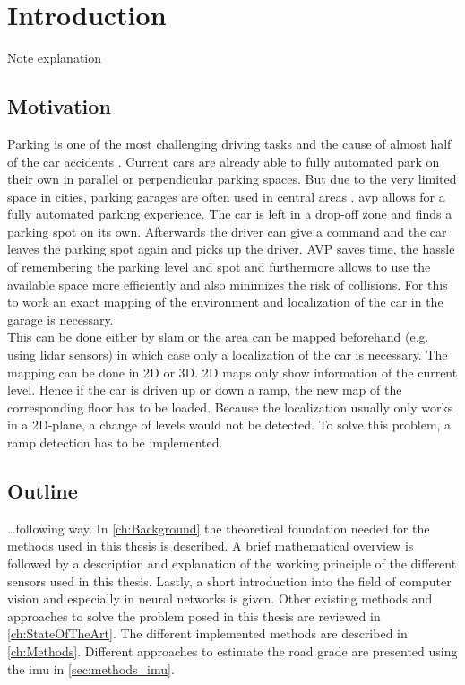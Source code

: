 \chapter{Introduction}
\label{ch:Introduction}
Note explanation

\section{Motivation}
Parking is one of the most challenging driving tasks and the cause of almost half of the car accidents \cite{accident}.
Current cars are already able to fully automated park on their own in parallel or perpendicular parking spaces.
But due to the very limited space in cities, parking garages are often used in central areas \cite{Banzhaf2017}.
\gls{avp} allows for a fully automated parking experience.
The car is left in a drop-off zone and finds a parking spot on its own.
Afterwards the driver can give a command and the car leaves the parking spot again and picks up the driver.
AVP saves time, the hassle of remembering the parking level and spot and furthermore allows to use the available space more efficiently and also minimizes the risk of collisions.
For this to work an exact mapping of the environment and localization of the car in the garage is necessary.\\
This can be done either by \gls{slam} or the area can be mapped beforehand (e.g. using \gls{lidar} sensors) in which case only a localization of the car is necessary.
The mapping can be done in 2D or 3D. 2D maps only show information of the current level. Hence if the car is driven up or down a ramp, the new map of the corresponding floor has to be loaded.
Because the localization usually only works in a 2D-plane, a change of levels would not be detected.
To solve this problem, a ramp detection has to be implemented.



\section{Outline}
\dots following way.
In \cref{ch:Background} the theoretical foundation needed for the methods used in this thesis is described.
A brief mathematical overview is followed by a description and explanation of the working principle of the different sensors used in this thesis.
Lastly, a short introduction into the field of computer vision and especially in neural networks is given.
Other existing methods and approaches to solve the problem posed in this thesis are reviewed in \cref{ch:StateOfTheArt}.
The different implemented methods are described in \cref{ch:Methods}.
Different approaches to estimate the road grade are presented using the \gls{imu} in \cref{sec:methods_imu}.
